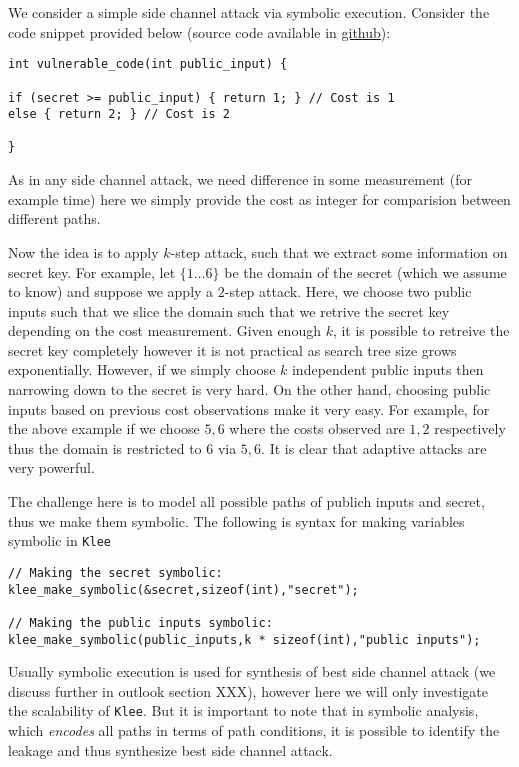 \documentclass[11pt,a4paper,notitlepage]{article}
\begin{document}
We consider a simple side channel attack via symbolic execution.
Consider the code snippet provided below (source code available in \href{https://github.com/irfansha/LBS_projects.git}{github}):
\begin{verbatim}
int vulnerable_code(int public_input) {

if (secret >= public_input) { return 1; } // Cost is 1
else { return 2; } // Cost is 2

}
\end{verbatim}

As in any side channel attack, we need difference in some measurement (for example time) here we simply provide the cost as integer
for comparision between different paths.

Now the idea is to apply $k$-step attack, such that we extract some information on secret key.
For example, let $\{1 \dots 6\}$ be the domain of the secret (which we assume to know) and suppose we apply a $2$-step attack.
Here, we choose two public inputs such that we slice the domain such that we retrive the secret key depending on the cost measurement.
Given enough $k$, it is possible to retreive the secret key completely however it is not practical as search tree size grows exponentially.
However, if we simply choose $k$ independent public inputs then narrowing down to the secret is very hard.
On the other hand, choosing public inputs based on previous cost observations make it very easy.
For example, for the above example if we choose ${5,6}$ where the costs observed are ${1,2}$ respectively thus the domain is restricted to ${6}$ via ${5,6}$. It is clear that adaptive attacks are very powerful.

The challenge here is to model all possible paths of publich inputs and secret, thus we make them symbolic.
The following is syntax for making variables symbolic in \texttt{Klee}
\begin{verbatim}
// Making the secret symbolic:
klee_make_symbolic(&secret,sizeof(int),"secret");

// Making the public inputs symbolic:
klee_make_symbolic(public_inputs,k * sizeof(int),"public inputs");
\end{verbatim}

Usually symbolic execution is used for synthesis of best side channel attack (we discuss further in outlook section XXX), however here we will only investigate the scalability of \texttt{Klee}.
But it is important to note that in symbolic analysis, which \emph{encodes} all paths in terms of path conditions, it is possible to identify the leakage and thus synthesize best side channel attack.
\end{document}
